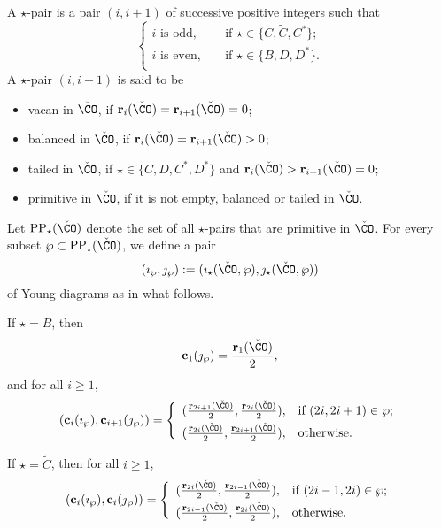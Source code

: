 \documentclass[ssunip.tex]{subfiles}
\begin{document}
\begin{defn}
 A $\star$-pair is a pair  $(i,i+1)$ of successive positive integers such that
\[
   \left\{
     \begin{array}{ll}
      i\textrm{ is odd}, \quad &\textrm{if $\star\in\{C, \widetilde{C}, C^*\}$};  \\
      i \textrm{ is even}, \quad &\textrm{if $\star\in\{B, D, D^*\}$}. \\
       \end{array}
   \right.
\]
A $\star$-pair   $(i,i+1)$ is said to be
\begin{itemize}
\item
vacan in $\check \CO$, if $\mathbf r_i(\check \CO)=\mathbf r_{i+1}(\check \CO)=0$;
\item
balanced in $\check \CO$,  if  $\mathbf r_i(\check \CO)=\mathbf r_{i+1}(\check \CO)>0$;
\item
tailed in $\check \CO$,  if $\star\in \{C, D, C^*, D^*\}$ and $\mathbf r_i(\check \CO)>\mathbf r_{i+1}(\check \CO)=0$;
\item
primitive in $\check \CO$, if  it is not empty, balanced or tailed in $\check \CO$.
\end{itemize}

\end{defn}

Let $\mathrm{PP}_\star(\check \CO)$ denote the  set of all $\star$-pairs that are primitive in $\check \CO$. For every subset $\wp\subset \mathrm{PP}_\star(\check \CO)$, we define a pair \[
(\imath_\wp, \jmath_\wp):=(\imath_\star(\check \CO, \wp), \jmath_\star(\check \CO, \wp))
\]
 of Young diagrams  as in what follows.

If $\star=B$, then
 \[
   \mathbf c_{1}(\jmath_\wp)=\frac{\mathbf r_1(\check \CO)}{2},
\]
and for all $i\geq 1$,
\[
(\mathbf c_{i}(\imath_\wp), \mathbf c_{i+1}(\jmath_\wp))=
   \left\{
     \begin{array}{ll}
           (\frac{\mathbf r_{2i+1}(\check \CO)}{2},  \frac{\mathbf r_{2i}(\check \CO)}{2}), &\hbox{if $(2i, 2i+1)\in \wp$}; \smallskip\\
            (\frac{\mathbf r_{2i}(\check \CO)}{2},  \frac{\mathbf r_{2i+1}(\check \CO)}{2}), &\hbox{otherwise}.\\
            \end{array}
   \right.
\]


If $\star=\widetilde{C}$, then for all $i\geq 1$,
\[
(\mathbf c_{i}(\imath_\wp), \mathbf c_{i}(\jmath_\wp))=
   \left\{
     \begin{array}{ll}
           (\frac{\mathbf r_{2i}(\check \CO)}{2},  \frac{\mathbf r_{2i-1}(\check \CO)}{2}), &\hbox{if $(2i-1, 2i)\in \wp$}; \smallskip\\
            (\frac{\mathbf r_{2i-1}(\check \CO)}{2},  \frac{\mathbf r_{2i}(\check \CO)}{2}), &\hbox{otherwise}.\\
            \end{array}
   \right.
\]
\end{document}
